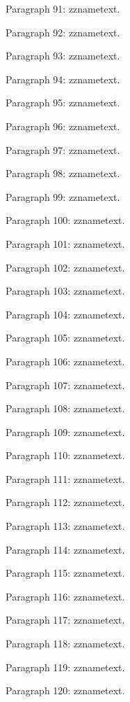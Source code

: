 \documentclass{article}
\begin{document}
Paragraph 91: \csname zzname\endcsname text.

Paragraph 92: \csname zzname\endcsname text.

Paragraph 93: \csname zzname\endcsname text.

Paragraph 94: \csname zzname\endcsname text.

Paragraph 95: \csname zzname\endcsname text.

Paragraph 96: \csname zzname\endcsname text.

Paragraph 97: \csname zzname\endcsname text.

Paragraph 98: \csname zzname\endcsname text.

Paragraph 99: \csname zzname\endcsname text.

Paragraph 100: \csname zzname\endcsname text.

Paragraph 101: \csname zzname\endcsname text.

Paragraph 102: \csname zzname\endcsname text.

Paragraph 103: \csname zzname\endcsname text.

Paragraph 104: \csname zzname\endcsname text.

Paragraph 105: \csname zzname\endcsname text.

Paragraph 106: \csname zzname\endcsname text.

Paragraph 107: \csname zzname\endcsname text.

Paragraph 108: \csname zzname\endcsname text.

Paragraph 109: \csname zzname\endcsname text.

Paragraph 110: \csname zzname\endcsname text.

Paragraph 111: \csname zzname\endcsname text.

Paragraph 112: \csname zzname\endcsname text.

Paragraph 113: \csname zzname\endcsname text.

Paragraph 114: \csname zzname\endcsname text.

Paragraph 115: \csname zzname\endcsname text.

Paragraph 116: \csname zzname\endcsname text.

Paragraph 117: \csname zzname\endcsname text.

Paragraph 118: \csname zzname\endcsname text.

Paragraph 119: \csname zzname\endcsname text.

Paragraph 120: \csname zzname\endcsname text.
\end{document}
